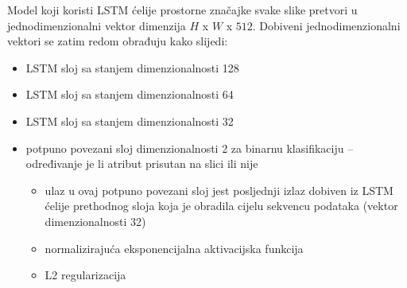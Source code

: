 \documentclass[times, utf8, diplomski, numeric]{fer}
\begin{document}
Model koji koristi LSTM ćelije prostorne značajke svake slike pretvori u jednodimenzionalni vektor dimenzija $H$ x $W$ x $512$.
Dobiveni jednodimenzionalni vektori se zatim redom obrađuju kako slijedi:
\begin{itemize}
 \item LSTM sloj sa stanjem dimenzionalnosti 128
 \item LSTM sloj sa stanjem dimenzionalnosti 64
 \item LSTM sloj sa stanjem dimenzionalnosti 32
  \item potpuno povezani sloj dimenzionalnosti 2 za binarnu klasifikaciju -- određivanje je li atribut prisutan na slici ili nije
 \begin{itemize}
  \item ulaz u ovaj potpuno povezani sloj jest posljednji izlaz dobiven iz LSTM ćelije prethodnog sloja koja je obradila cijelu sekvencu podataka (vektor dimenzionalnosti 32)
  \item normalizirajuća eksponencijalna  aktivacijska funkcija
  \item L2 regularizacija
 \end{itemize}
\end{itemize}
\end{document}
